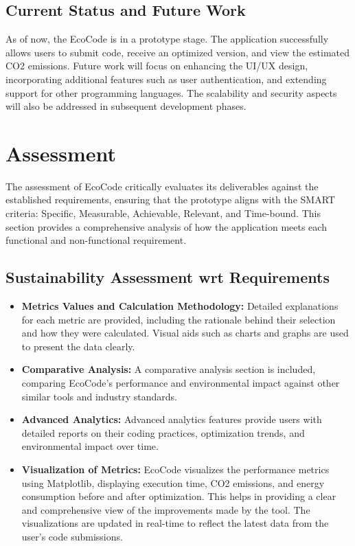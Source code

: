 \documentclass[conference,compsoc]{IEEEtran}
\begin{document}
\subsection{Current Status and Future Work}
As of now, the EcoCode is in a prototype stage. The application successfully allows users to submit  code, receive an optimized version, and view the estimated CO2 emissions. Future work will focus on enhancing the UI/UX design, incorporating additional features such as user authentication, and extending support for other programming languages. The scalability and security aspects will also be addressed in subsequent development phases.

\section{Assessment}
The assessment of EcoCode critically evaluates its deliverables against the established requirements, ensuring that the prototype aligns with the SMART criteria: Specific, Measurable, Achievable, Relevant, and Time-bound. This section provides a comprehensive analysis of how the application meets each functional and non-functional requirement.

\subsection{Sustainability Assessment wrt Requirements}
\label{sec:sustainability_assessment}

\begin{itemize}
	\item \textbf{Metrics Values and Calculation Methodology:} Detailed explanations for each metric are provided, including the rationale behind their selection and how they were calculated. Visual aids such as charts and graphs are used to present the data clearly.

	\item \textbf{Comparative Analysis:} A comparative analysis section is included, comparing EcoCode's performance and environmental impact against other similar tools and industry standards.

	\item \textbf{Advanced Analytics:} Advanced analytics features provide users with detailed reports on their coding practices, optimization trends, and environmental impact over time.

	\item \textbf{Visualization of Metrics:} EcoCode visualizes the performance metrics using Matplotlib, displaying execution time, CO2 emissions, and energy consumption before and after optimization. This helps in providing a clear and comprehensive view of the improvements made by the tool. The visualizations are updated in real-time to reflect the latest data from the user's code submissions.
\end{itemize}
\end{document}
